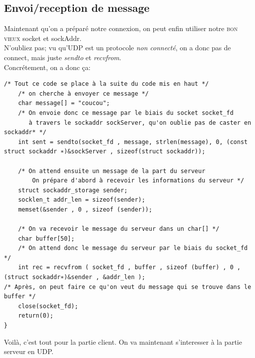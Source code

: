 \documentclass{report}
\begin{document}
\subsection{Envoi/reception de message}
Maintenant qu'on a préparé notre connexion, on peut enfin utiliser notre \textsc{bon vieux} socket et sockAddr.\\
N'oubliez pas; vu qu'UDP est un protocole \emph{non connecté}, on a donc pas de connect, mais juste \emph{sendto} et \emph{recvfrom}.\\
Concrétement, on  a donc ça:
\begin{lstlisting}
/* Tout ce code se place à la suite du code mis en haut */
	/* on cherche à envoyer ce message */
	char message[] = "coucou";
	/* On envoie donc ce message par le biais du socket socket_fd
	   à travers le sockaddr sockServer, qu'on oublie pas de caster en sockaddr* */
	int sent = sendto(socket_fd , message, strlen(message), 0, (const struct sockaddr ∗)&sockServer , sizeof(struct sockaddr));

	/* On attend ensuite un message de la part du serveur
	    On prépare d'abord à recevoir les informations du serveur */
	struct sockaddr_storage sender;
	socklen_t addr_len = sizeof(sender); 
	memset(&sender , 0 , sizeof (sender));
	
	/* On va recevoir le message du serveur dans un char[] */
	char buffer[50];
	/* On attend donc le message du serveur par le biais du socket_fd */
	int rec = recvfrom ( socket_fd , buffer , sizeof (buffer) , 0 , (struct sockaddr∗)&sender , &addr_len );
/* Après, on peut faire ce qu'on veut du message qui se trouve dans le buffer */
	close(socket_fd);
	return(0);
}
\end{lstlisting}
Voilà, c'est tout pour la partie client. On va maintenant s'interesser à la partie serveur en UDP.
\end{document}
